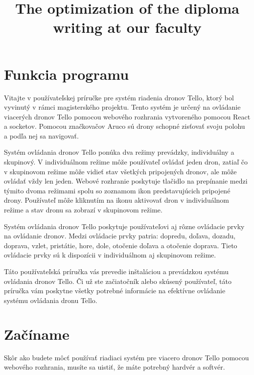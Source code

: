 \documentclass[a4paper]{feidippp}
\title{The optimization of the diploma writing at our faculty}
\begin{document}




\titulnastrana

\newpage


\tableofcontents

\newpage

\listoffigures

\newpage


\setcounter{page}{1}

\section{Funkcia programu}
Vitajte v používateľskej príručke pre systém riadenia dronov Tello, ktorý bol vyvinutý v rámci magisterského projektu. Tento systém je určený na ovládanie viacerých dronov Tello pomocou webového rozhrania vytvoreného pomocou React a socketov. Pomocou značkovačov Aruco sú drony schopné zisťovať svoju polohu a podľa nej sa navigovať.

Systém ovládania dronov Tello ponúka dva režimy prevádzky, individuálny a skupinový. V individuálnom režime môže používateľ ovládať jeden dron, zatiaľ čo v skupinovom režime môže vidieť stav všetkých pripojených dronov, ale môže ovládať vždy len jeden. Webové rozhranie poskytuje tlačidlo na prepínanie medzi týmito dvoma režimami spolu so zoznamom ikon predstavujúcich pripojené drony. Používateľ môže kliknutím na ikonu aktivovať dron v individuálnom režime a stav dronu sa zobrazí v skupinovom režime.

Systém ovládania dronov Tello poskytuje používateľovi aj rôzne ovládacie prvky na ovládanie dronov. Medzi ovládacie prvky patria: dopredu, doľava, dozadu, doprava, vzlet, pristátie, hore, dole, otočenie doľava a otočenie doprava. Tieto ovládacie prvky sú k dispozícii v individuálnom aj skupinovom režime.

Táto používateľská príručka vás prevedie inštaláciou a prevádzkou systému ovládania dronov Tello. Či už ste začiatočník alebo skúsený používateľ, táto príručka vám poskytne všetky potrebné informácie na efektívne ovládanie systému ovládania dronu Tello.

\newpage
\section{Začíname}
Skôr ako budete môcť používať riadiaci systém pre viacero dronov Tello pomocou webového rozhrania, musíte sa uistiť, že máte potrebný hardvér a softvér.
\end{document}
